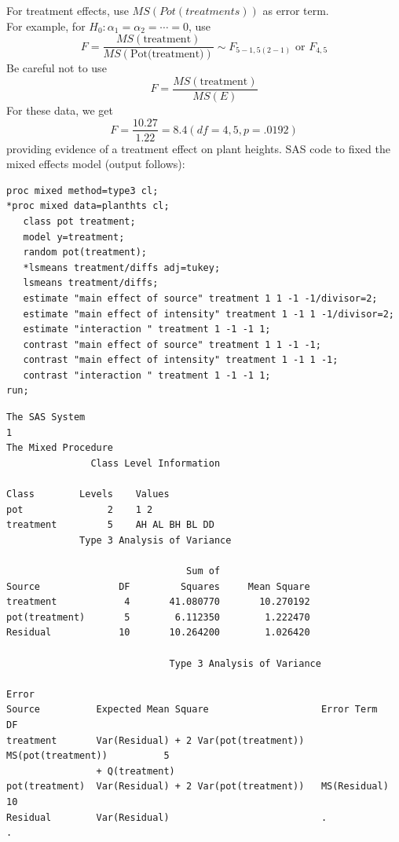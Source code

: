 \begin{LARGE}
\noindent
For treatment effects, use $MS(Pot(treatments))$ as error term.  \\
For example, for $H_0: \alpha_1=\alpha_2=\cdots=0$, use
$$ F = \frac{MS(\mbox{treatment})}{MS(\mbox{Pot(treatment)})} \sim F_{5-1,5(2-1)} \mbox{ or }F_{4,5}$$
Be careful not to use
$$ F = \frac{MS(\mbox{treatment})}{MS(E)}$$
For these data, we get
$$ F=\frac{10.27}{1.22}=8.4 (df=4,5, p=.0192)$$
providing evidence of a treatment effect on plant heights.
SAS code to fixed the mixed effects model (output follows):
\begin{small}
\begin{verbatim}
proc mixed method=type3 cl;
*proc mixed data=planthts cl;
   class pot treatment;
   model y=treatment;
   random pot(treatment);
   *lsmeans treatment/diffs adj=tukey;
   lsmeans treatment/diffs; 
   estimate "main effect of source" treatment 1 1 -1 -1/divisor=2;
   estimate "main effect of intensity" treatment 1 -1 1 -1/divisor=2;
   estimate "interaction " treatment 1 -1 -1 1;
   contrast "main effect of source" treatment 1 1 -1 -1;
   contrast "main effect of intensity" treatment 1 -1 1 -1;
   contrast "interaction " treatment 1 -1 -1 1;
run;
\end{verbatim}
\newpage
\begin{verbatim}
The SAS System                                                                      1
The Mixed Procedure
               Class Level Information
 
Class        Levels    Values
pot               2    1 2                           
treatment         5    AH AL BH BL DD                
             Type 3 Analysis of Variance
 
                                Sum of
Source              DF         Squares     Mean Square
treatment            4       41.080770       10.270192
pot(treatment)       5        6.112350        1.222470
Residual            10       10.264200        1.026420

                             Type 3 Analysis of Variance
                                                                                Error
Source          Expected Mean Square                    Error Term                 DF
treatment       Var(Residual) + 2 Var(pot(treatment))   MS(pot(treatment))          5
                + Q(treatment)                                                       
pot(treatment)  Var(Residual) + 2 Var(pot(treatment))   MS(Residual)               10
Residual        Var(Residual)                           .                           .


\end{verbatim}
\end{small}
\end{LARGE}
